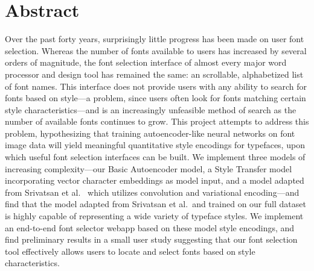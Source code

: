 \chapter*{Abstract}
\label{chap:abstract}

Over the past forty years, surprisingly little progress has been made on user font selection. Whereas the number of fonts available to users has increased by several orders of magnitude, the font selection interface of almost every major word processor and design tool has remained the same: an scrollable, alphabetized list of font names. This interface does not provide users with any ability to search for fonts based on style---a problem, since users often look for fonts matching certain style characteristics---and is an increasingly unfeasible method of search as the number of available fonts continues to grow. This project attempts to address this problem, hypothesizing that training autoencoder-like neural networks on font image data will yield meaningful quantitative style encodings for typefaces, upon which useful font selection interfaces can be built. We implement three models of increasing complexity---our Basic Autoencoder model, a Style Transfer model incorporating vector character embeddings as model input, and a model adapted from Srivatsan et al.\ \cite{srivatsan2020} which utilizes convolution and variational encoding---and find that the model adapted from Srivatsan et al.\ and trained on our full dataset is highly capable of representing a wide variety of typeface styles. We implement an end-to-end font selector webapp based on these model style encodings, and find preliminary results in a small user study suggesting that our font selection tool effectively allows users to locate and select fonts based on style characteristics.